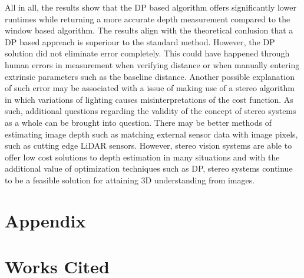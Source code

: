 \documentclass[11pt]{scrartcl}
\begin{document}
All in all, the results show that the DP based algorithm offers significantly lower 
runtimes while returning a more accurate depth measurement compared to the window 
based algorithm. The results align with the theoretical conlusion that a DP based 
appreach is superiour to the standard method. However, the DP solution did not 
eliminate error completely. This could have happened through human errors in measurement 
when verifying distance or when manually entering extrinsic parameters such as the 
baseline distance. Another possible explanation of such error may be associated with 
a issue of making use of a stereo algorithm in which variations of lighting causes 
misinterpretations of the cost function. As such, additional questions regarding the 
validity of the concept of stereo systems as a whole can be brought into question. 
There may be better methods of estimating image depth such as matching external sensor 
data with image pixels, such as cutting edge LiDAR sensors. However, stereo vision systems 
are able to offer low cost solutions to depth estimation in many situations and with 
the additional value of optimization techniques such as DP, stereo systems continue to be 
a feasible solution for attaining 3D understanding from images. 



\section{Appendix}


\section{Works Cited}
\end{document}
